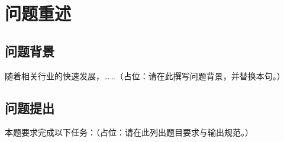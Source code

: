 \section{问题重述}

\subsection{问题背景}
随着相关行业的快速发展，……（占位：请在此撰写问题背景，并替换本句。）

\subsection{问题提出}
本题要求完成以下任务：（占位：请在此列出题目要求与输出规范。）
